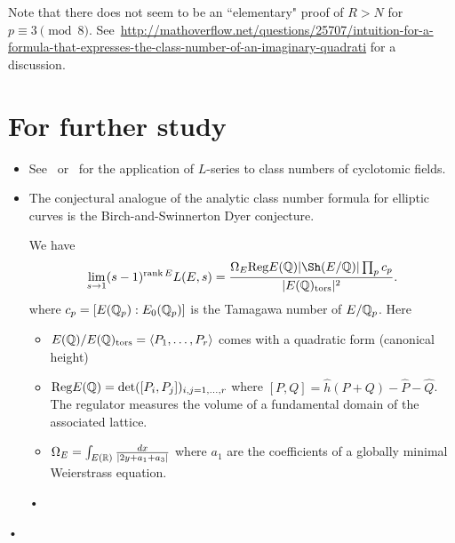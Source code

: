 Note that there does not seem to be an ``elementary" proof of $R>N$ for $p\equiv 3\pmod 8$. See~\url{http://mathoverflow.net/questions/25707/intuition-for-a-formula-that-expresses-the-class-number-of-an-imaginary-quadrati} for a discussion.
%

\section{For further study}
\begin{itemize}
\item
See~\cite[\S5.5]{BS66} or~\cite[Chapter 4]{Wa82} for the application of $L$-series to class numbers of cyclotomic fields.
\item 
The conjectural analogue of the analytic class number formula for elliptic curves is the Birch-and-Swinnerton Dyer conjecture.
\begin{conj}
We have
\[
\lim_{s \to 1}(s-1)^{\rank E}L(E,s)=\fc{\Om_E\text{Reg} E(\Q)|\Sh(E/\Q)|\prod_p c_p}{|E(\Q)\tors|^2}.
\]
where $c_p=[E(\mathbb{Q}_p):E_0(\mathbb{Q}_p)]$ is the Tamagawa number of $E/\mathbb{Q}_p$. Here
\begin{itemize}
\item
$E(\mathbb{Q})/E(\mathbb{Q})_{\text{tors}}=\left\langle {P_1,\ldots, P_r}\right\rangle$ comes with a quadratic form (canonical height)
\item
$\text{Reg}E(\mathbb{Q})=\det ([P_i,P_j])_{i,j=1,\ldots, r}$ where $[P,Q]=\hat h(P+Q)-\hat P-\hat Q$. The regulator measures the volume of a fundamental domain of the associated lattice.
\item $\Omega_E=\int_{E(\mathbb{R})}\frac{dx}{|2y+a_1+a_3|}$ where $a_1$ are the coefficients of a globally minimal Weierstrass equation.
\end{itemize}•
\end{conj}
\end{itemize}•
%
%


